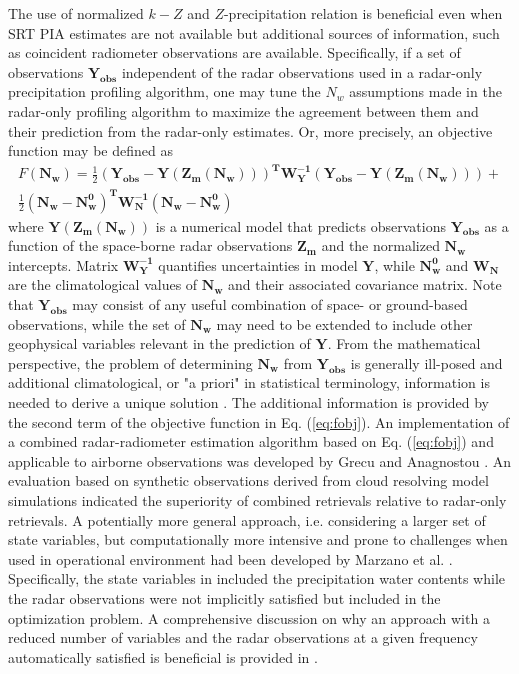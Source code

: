 \documentclass[10pt]{ietbook}
\begin{document}
The use of normalized $k-Z$ and $Z$-precipitation relation is beneficial even when SRT PIA estimates are not available
but additional sources of information, such as coincident radiometer observations are available.  Specifically, if a
set of observations $\mathbf{Y_{obs}}$ independent of the radar observations used in a radar-only precipitation profiling algorithm,
one may tune the $N_w$ assumptions made in the radar-only profiling algorithm to maximize the agreement between
them and their prediction from the radar-only estimates.  Or, more precisely, an objective function may be defined as 
\begin{multline} \label{eq:fobj}
    F(\mathbf{N_w})=\frac {1}{2} \mathbf{(Y_{obs}-Y(Z_m(N_w)))^T W_Y^{-1} (Y_{obs}-Y(Z_m(N_w)))} +\\
    \frac {1} {2} \mathbf{(N_w-N_w^0)^T W_N^{-1} (N_w-N_w^0)}
\end{multline}
where $\mathbf{Y(Z_m(N_w))}$ is a numerical model that predicts observations $\mathbf{Y_{obs}}$ as a function of the space-borne
radar observations $\mathbf{Z_m}$ and the normalized $\mathbf{N_w}$ intercepts. Matrix $\mathbf{W_Y^{-1}}$ quantifies uncertainties
in model $\mathbf{Y}$, while $\mathbf{N_w^0}$ and $\mathbf{W_N}$ are the climatological values of $\mathbf{N_w}$ and their 
associated covariance matrix.
Note that $\mathbf{Y_{obs}}$ may consist of any useful combination of space- or ground-based observations, while the set of $\mathbf{N_w}$ may
need to be extended to include other geophysical variables relevant in the prediction of $\mathbf{Y}$.  From the mathematical perspective,
the problem of determining $\mathbf{N_w}$ from $\mathbf{Y_{obs}}$ is generally ill-posed and additional climatological, or 
"a priori" in statistical terminology, information is needed to derive a unique solution \cite{tarantola2005}.  The additional information
is provided by the second term of the objective function in Eq. (\ref{eq:fobj}). An implementation of a combined radar-radiometer estimation
algorithm based on Eq. (\ref{eq:fobj}) and applicable to airborne observations was developed by Grecu and Anagnostou \cite{grecu2002}.
An evaluation based on synthetic observations derived from cloud resolving model simulations indicated the superiority of combined retrievals
relative
to radar-only retrievals.  A potentially more general approach, i.e. considering a larger set of state variables, but computationally 
more intensive and prone to challenges when used in operational environment had been developed by Marzano et al. \cite{marzano1999}.
Specifically, the state variables in \cite{marzano1999} included the precipitation water contents while the radar observations were 
not implicitly satisfied but included in the optimization problem.  A comprehensive discussion on why an approach with a reduced number
of variables and the radar observations at a given frequency automatically satisfied is beneficial is provided in \cite{grecu2002}.
\end{document}

